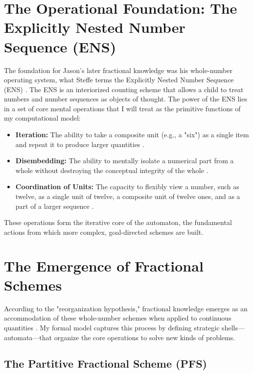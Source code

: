 \documentclass{article}
\begin{document}
\section{The Operational Foundation: The Explicitly Nested Number Sequence (ENS)}

The foundation for Jason's later fractional knowledge was his whole-number operating system, what Steffe terms the Explicitly Nested Number Sequence (ENS) \autocite{steffe2002new}. The ENS is an interiorized counting scheme that allows a child to treat numbers and number sequences as objects of thought. The power of the ENS lies in a set of core mental operations that I will treat as the primitive functions of my computational model:

\begin{itemize}
    \item \textbf{Iteration:} The ability to take a composite unit (e.g., a "six") as a single item and repeat it to produce larger quantities \autocite{steffe2014childrens}.
    \item \textbf{Disembedding:} The ability to mentally isolate a numerical part from a whole without destroying the conceptual integrity of the whole \autocite{steffe2002new}.
    \item \textbf{Coordination of Units:} The capacity to flexibly view a number, such as twelve, as a single unit of twelve, a composite unit of twelve ones, and as a part of a larger sequence \autocite{steffe2004fractional}.
\end{itemize}

These operations form the iterative core of the automaton, the fundamental actions from which more complex, goal-directed schemes are built.

\section{The Emergence of Fractional Schemes}

According to the "reorganization hypothesis," fractional knowledge emerges as an accommodation of these whole-number schemes when applied to continuous quantities \autocite{steffe2002new}. My formal model captures this process by defining strategic shells—automata—that organize the core operations to solve new kinds of problems.

\subsection{The Partitive Fractional Scheme (PFS)}
\end{document}
